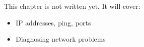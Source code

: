 \label{ch:linux5}
\begin{keyidea}
This chapter is not written yet. It will cover:
\begin{itemize}[nosep]
  \item IP addresses, ping, ports
  \item Diagnosing network problems
\end{itemize}
\end{keyidea}
